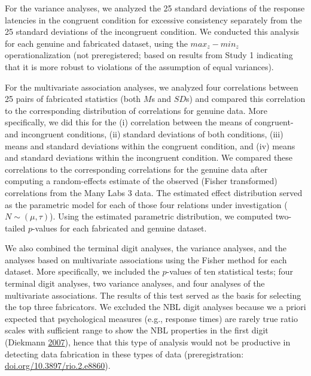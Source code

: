\documentclass[a5paper]{book}
\begin{document}
For the variance analyses, we analyzed the 25 standard deviations of the
response latencies in the congruent condition for excessive consistency
separately from the 25 standard deviations of the incongruent condition.
We conducted this analysis for each genuine and fabricated dataset,
using the \(max_z-min_z\) operationalization (not preregistered; based
on results from Study 1 indicating that it is more robust to violations
of the assumption of equal variances).

For the multivariate association analyses, we analyzed four correlations
between 25 pairs of fabricated statistics (both \(M\)s and \(SD\)s) and
compared this correlation to the corresponding distribution of
correlations for genuine data. More specifically, we did this for the
(i) correlation between the means of congruent- and incongruent
conditions, (ii) standard deviations of both conditions, (iii) means and
standard deviations within the congruent condition, and (iv) means and
standard deviations within the incongruent condition. We compared these
correlations to the corresponding correlations for the genuine data
after computing a random-effects estimate of the observed (Fisher
transformed) correlations from the Many Labs 3 data. The estimated
effect distribution served as the parametric model for each of those
four relations under investigation (\(N\sim(\mu,\tau)\)). Using the
estimated parametric distribution, we computed two-tailed \(p\)-values
for each fabricated and genuine dataset.

We also combined the terminal digit analyses, the variance analyses, and
the analyses based on multivariate associations using the Fisher method
for each dataset. More specifically, we included the \(p\)-values of ten
statistical tests; four terminal digit analyses, two variance analyses,
and four analyses of the multivariate associations. The results of this
test served as the basis for selecting the top three fabricators. We
excluded the NBL digit analyses because we a priori expected that
psychological measures (e.g., response times) are rarely true ratio
scales with sufficient range to show the NBL properties in the first
digit (Diekmann
\protect\hyperlink{ref-doi:10.1080ux2f02664760601004940}{2007}), hence
that this type of analysis would not be productive in detecting data
fabrication in these types of data (preregistration:
\href{https://doi.org/10.3897/rio.2.e8860}{doi.org/10.3897/rio.2.e8860}).
\end{document}
